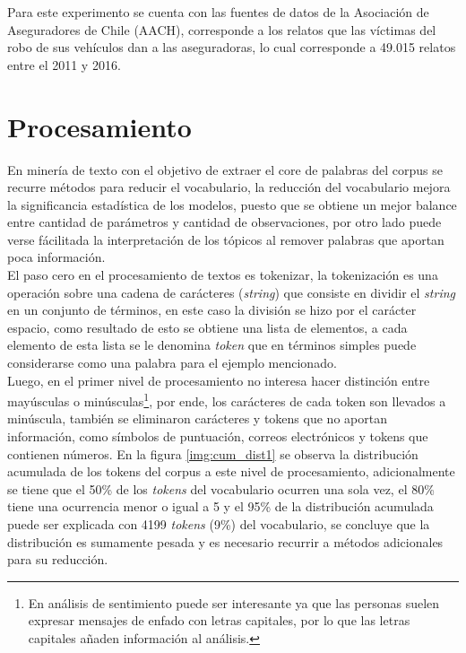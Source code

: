 \documentclass[letterpaper,12pt,oneside]{book} %
\begin{document}
Para este experimento se cuenta con las fuentes de datos de la Asociación de Aseguradores de Chile (AACH), corresponde a los relatos que las víctimas del robo de sus vehículos dan a las aseguradoras, lo cual corresponde a 49.015 relatos entre el 2011 y 2016.\\



\section{Procesamiento}

En minería de texto con el objetivo de extraer el core de palabras del corpus se recurre métodos para reducir el vocabulario, la reducción del vocabulario mejora la significancia estadística de los modelos, puesto que se obtiene un mejor balance entre cantidad de parámetros y cantidad de observaciones, por otro lado puede verse fácilitada la interpretación de los tópicos al remover palabras que aportan poca información. \\

El paso cero en el procesamiento de textos es tokenizar, la tokenización es una operación sobre una cadena de carácteres (\textit{string}) que consiste en dividir el \textit{string} en un conjunto de términos, en este caso la división se hizo por el carácter espacio, como resultado de esto se obtiene una lista de elementos, a cada elemento de esta lista se le denomina \textit{token} que en términos simples puede considerarse como una palabra para el ejemplo mencionado. \\

Luego, en el primer nivel de procesamiento no interesa hacer distinción entre mayúsculas o minúsculas\footnote{En análisis de sentimiento puede ser interesante ya que las personas suelen expresar mensajes de enfado con letras capitales, por lo que las letras capitales añaden información al análisis.}, por ende, los carácteres de cada token son llevados a minúscula, también se eliminaron carácteres y tokens que no aportan información, como símbolos de puntuación, correos electrónicos y tokens que contienen números. En la figura \ref{img:cum_dist1} se observa la distribución acumulada de los tokens del corpus a este nivel de procesamiento, adicionalmente se tiene que el 50\% de los \textit{tokens} del vocabulario ocurren una sola vez, el 80\% tiene una ocurrencia menor o igual a 5 y el 95\% de la distribución acumulada puede ser explicada con 4199 \textit{tokens} (9\%) del vocabulario, se concluye que la distribución es sumamente pesada y es necesario recurrir a métodos adicionales para su reducción.\\
\end{document}
